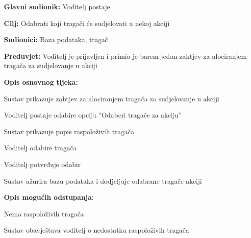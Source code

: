 					
					\noindent {}
					\begin{packed_item}
						
						\item \textbf{Glavni sudionik:} Voditelj postaje
						\item \textbf{Cilj:} Odabrati koji tragači će sudjelovati u nekoj akciji
						\item \textbf{Sudionici:} Baza podataka, tragač
						\item \textbf{Preduvjet:} Voditelj je prijavljen i primio je barem jedan zahtjev za alociranjem tragača za sudjelovanje u akciji
						\item \textbf{Opis osnovnog tijeka:}
						
						\item[] \begin{packed_enum}
							
							\item Sustav prikazuje zahtjev za alociranjem tragača za sudjelovanje u akciji
							\item Voditelj postaje odabire opciju "Odaberi tragače za akciju"
							\item Sustav prikazuje popis raspoloživih tragača
							\item Voditelj odabire tragača
							\item Voditelj potvrđuje odabir
							\item Sustav ažurira bazu podataka i dodjeljuje odabrane tragače akciji 
						\end{packed_enum}
						
						\item  \textbf{Opis mogućih odstupanja:}
						
						\item[] \begin{packed_item}
							
							\item[2.a] Nema raspoloživih tragača
							\item[] \begin{packed_enum}
								
								\item Sustav obavještava voditelj o nedostatku raspoloživih tragača								
							\end{packed_enum}
							
						\end{packed_item}
						
					\end{packed_item}
					
